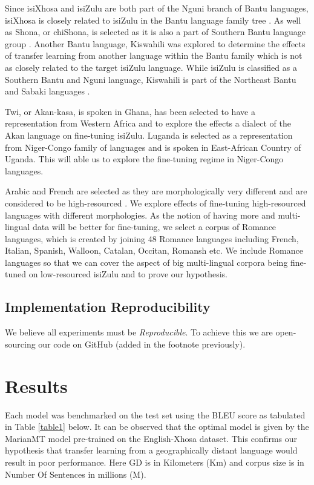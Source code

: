 \documentclass[11pt]{article}
\begin{document}
Since  isiXhosa and isiZulu are both part of the Nguni branch of Bantu languages, isiXhosa is closely related to isiZulu in the Bantu language family tree \cite{nyoni2021low}. As well as Shona, or chiShona, is selected as it is also a part of Southern Bantu language group \citep{nyoni2021low}. Another Bantu language, Kiswahili was explored to determine the effects of transfer learning from another language within the Bantu family which is not as closely related to the target isiZulu language. While isiZulu is classified as a Southern Bantu and Nguni language, Kiswahili is part of the Northeast Bantu and Sabaki languages \cite{nurse1993swahili}.

Twi, or Akan-kasa, is spoken in Ghana, has been selected to have a representation from Western Africa and to explore the effects a dialect of the Akan language on fine-tuning isiZulu. Luganda is selected as a representation from Niger-Congo family of languages and is spoken in East-African Country of Uganda. This will able us to explore the fine-tuning regime in Niger-Congo languages.

Arabic and French are selected as they are morphologically very different and are considered to be high-resourced \citep{ali2014advances,besacier2014introduction}. We explore effects of fine-tuning high-resourced languages with different morphologies. As the notion of having more and multi-lingual data will be better for fine-tuning, we select a corpus of Romance languages, which is created by joining 48 Romance languages including French, Italian, Spanish, Walloon, Catalan, Occitan, Romansh etc. We include Romance languages so that we can cover the aspect of big multi-lingual corpora being fine-tuned on low-resourced isiZulu and to prove our hypothesis.




\subsection{Implementation Reproducibility}

We believe all experiments must be \emph{Reproducible}. To achieve this we are open-sourcing our code on GitHub (added in the footnote previously).



\section{Results}

Each model was benchmarked on the test set using the BLEU\citep{papineni2002bleu} score as tabulated in Table \ref{table1} below. It can be observed that the optimal model is given by the MarianMT model pre-trained on the English-Xhosa dataset. This confirms our hypothesis that transfer learning from a geographically distant language would result in poor performance. Here GD is in Kilometers (Km) and corpus size is in Number Of Sentences in millions (M).
\end{document}
